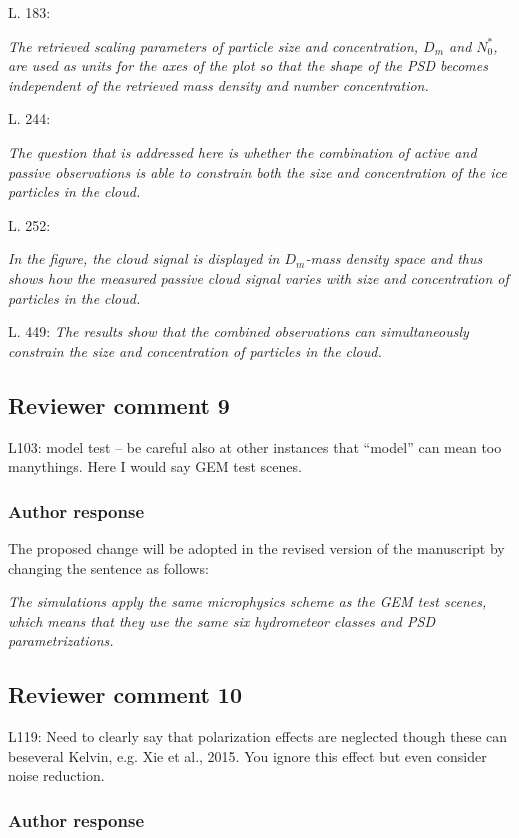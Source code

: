 \documentclass[11pt]{scrartcl}
\begin{document}
L. 183:

{\itshape The retrieved scaling parameters of particle size and concentration,
  $D_m$ and $N_0^*$, are used as units for the axes of the plot so that the
  shape of the PSD becomes independent of the retrieved mass density and number
  concentration. }

L. 244:

{\itshape The question that is addressed here is whether the combination of active
  and passive observations is able to constrain both the size and concentration
  of the ice particles in the cloud.}

L. 252:

{\itshape In the figure, the cloud signal is displayed in $D_m$-mass density
  space and thus shows how the measured passive cloud signal varies with size
  and concentration of particles in the cloud. }


L. 449:
{\itshape The results show that the combined observations can simultaneously
  constrain the size and concentration of particles in the cloud.}


\subsection*{Reviewer comment 9}
L103: model test – be careful also at other instances that “model” can mean too manythings. Here I would say GEM test scenes.

\subsubsection*{Author response}

The proposed change will be adopted in the revised version of the manuscript by
changing the sentence as follows:

{\itshape
The simulations apply the same microphysics scheme
as the GEM test scenes, which means that they use the same six hydrometeor classes
and PSD parametrizations.}


\subsection*{Reviewer comment 10}
L119: Need to clearly say that polarization effects are neglected though these can beseveral Kelvin, e.g.  Xie et al., 2015.  You ignore this effect but even consider noise reduction.

\subsubsection*{Author response}
\end{document}
